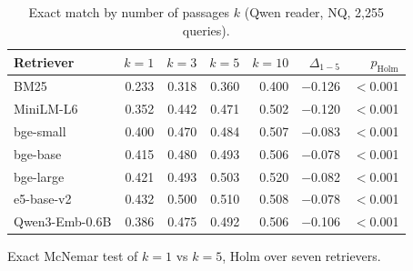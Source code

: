 \begin{table}[t]
\centering
\small
\caption{Exact match by number of passages $k$ (Qwen reader, NQ, 2,255 queries).}
\label{tab:topk}
\begin{tabular}{lrrrrrr}
\toprule
Retriever & $k{=}1$ & $k{=}3$ & $k{=}5$ & $k{=}10$ & $\Delta_{1-5}$ & $p_\text{Holm}$ \\
\midrule
BM25 & 0.233 & 0.318 & 0.360 & 0.400 & $-$0.126 & $<$0.001 \\
MiniLM-L6 & 0.352 & 0.442 & 0.471 & 0.502 & $-$0.120 & $<$0.001 \\
bge-small & 0.400 & 0.470 & 0.484 & 0.507 & $-$0.083 & $<$0.001 \\
bge-base & 0.415 & 0.480 & 0.493 & 0.506 & $-$0.078 & $<$0.001 \\
bge-large & 0.421 & 0.493 & 0.503 & 0.520 & $-$0.082 & $<$0.001 \\
e5-base-v2 & 0.432 & 0.500 & 0.510 & 0.508 & $-$0.078 & $<$0.001 \\
Qwen3-Emb-0.6B & 0.386 & 0.475 & 0.492 & 0.506 & $-$0.106 & $<$0.001 \\
\bottomrule
\end{tabular}
\par\smallskip\parbox{\linewidth}{\footnotesize Exact McNemar test of $k{=}1$ vs $k{=}5$, Holm over seven retrievers.}
\end{table}
